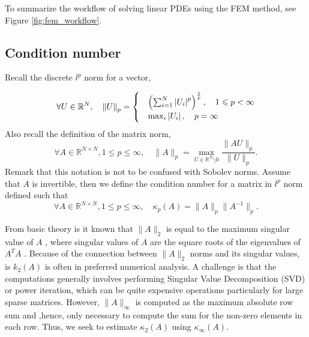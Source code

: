 To summarize the workflow of solving linear PDEs using the FEM method, see Figure \ref{fig:fem_workflow}.

\subsection{Condition number}%
\label{sub:note_on_condition_number}

Recall the discrete $l^{p}$ norm for a vector,

 \begin{equation}
     \forall U \in \mathbb{R} ^{N}, \quad
\| U  \|_{ p }^{  } =
     \begin{cases}
     &  \left( \sum_{i=1}^{N}  \left\lvert  U_{i}   \right\rvert^{p} \right)^{\frac{1}{p}} , \quad  1\leqslant p < \infty \\
   &  \max_{i}  \left\lvert  U_i  \right\rvert,  \quad  p= \infty
     \end{cases}
 \end{equation}
Also recall the definition of the matrix norm,
\begin{equation}
 \forall A \in \mathbb{R} ^{N\times N}, 1\le p \le  \infty, \quad  \| A  \|_{p  }^{  }  = \max_{U \in \mathbb{R} ^{N} \setminus 0} \frac{\| AU \|_{ p }^{  } }{\| U \|_{p}^{  } }.
\end{equation}
Remark that this notation is not to be confused with Sobolev norms.
Assume that $A $ is invertible, then we define the condition number for a matrix in $l^{p}  $ norm defined such that
\begin{equation}
    \label{eq:condition_num}
 \forall A \in \mathbb{R} ^{N\times N}, 1\le p \le  \infty, \quad  \kappa_{p} ( A) = \| A  \|_{ p }^{  } \| A ^{-1} \|_{ p }.
\end{equation}

From basic theory is it known that $\| A \|_{ 2 }^{  } $   is equal to the maximum singular value of $A$ , where singular values of $ A$  are the square roots of the eigenvalues of $A^TA$ \cite[Theorem 2.9]{ suli2003introduction}. Because of the connection
between $\| A \|_{ 2 }^{  } $ norms and its singular values, is $k_{2}( A) $ is often in preferred numerical analysis.
A challenge is that the computations generally involves performing Singular Value Decomposition (SVD)
 or power iteration, which can be quite expensive operations particularly for large sparse matrices.
 However,  $\| A \|_{ \infty }^{  } $ is computed as the maximum absolute row sum and ,hence, only necessary to compute the sum for the non-zero elements in each row. Thus, we seek to estimate
 $\kappa_{2}( A) $ using $ \kappa _{\infty}( A) $.

